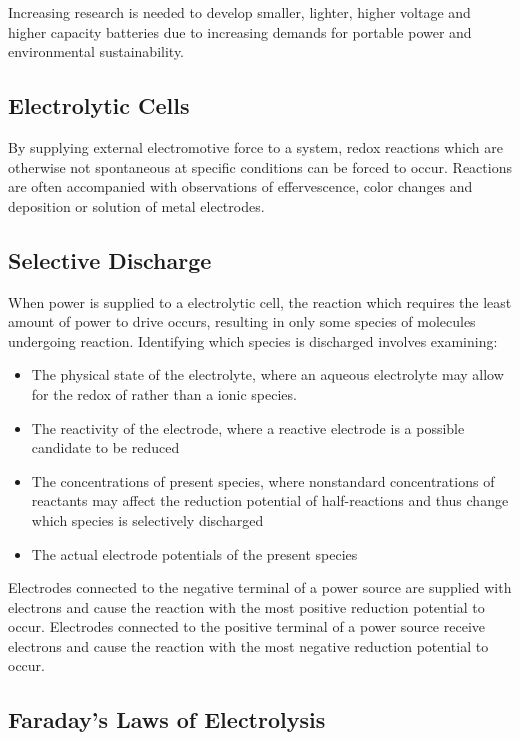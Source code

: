 \documentclass[../main]{subfiles}
\begin{document}
	Increasing research is needed to develop smaller, lighter, higher voltage and higher capacity batteries due to increasing demands for portable power and environmental sustainability. \\

	\subsection{Electrolytic Cells}

	By supplying external electromotive force to a system, redox reactions which are otherwise not spontaneous at specific conditions can be forced to occur. Reactions are often accompanied with observations of effervescence, color changes and deposition or solution of metal electrodes.

	\subsection{Selective Discharge}

	When power is supplied to a electrolytic cell, the reaction which requires the least amount of power to drive occurs, resulting in only some species of molecules undergoing reaction. Identifying which species is discharged involves examining:

	\begin{itemize}
		\item The physical state of the electrolyte, where an aqueous electrolyte may allow for the redox of  rather than a ionic species.
		\item The reactivity of the electrode, where a reactive electrode is a possible candidate to be reduced 
		\item The concentrations of present species, where nonstandard concentrations of reactants may affect the reduction potential of half-reactions and thus change which species is selectively discharged
		\item The actual electrode potentials of the present species
	\end{itemize}

	Electrodes connected to the negative terminal of a power source are supplied with electrons and cause the reaction with the most positive reduction potential to occur. Electrodes connected to the positive terminal of a power source receive electrons and cause the reaction with the most negative reduction potential to occur.

	\subsection{Faraday's Laws of Electrolysis}
\end{document}
